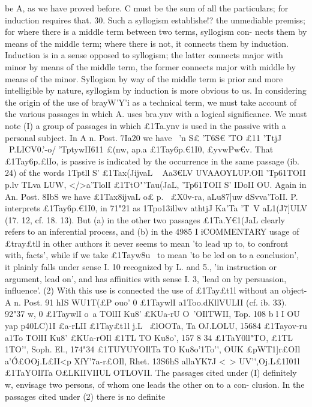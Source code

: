 {{{{{{{{{{{{be A, as we have proved before. C must be the sum of all the
particulars; for induction requires that.
30. Such a syllogism establishe!? the unmediable premiss; for
where there is a middle term between two terms, syllogism con-
nects them by means of the middle term; where there is not, it
connects them by induction. Induction is in a sense opposed to
syllogism; the latter connects major with minor by means of the
middle term, the former connects major with middle by means of
the minor. Syllogism by way of the middle term is prior and more
intelligible by nature, syllogism by induction is more obvious to us.
In considering the origin of the use of brayW'Y'i as a technical
term, we must take account of the various passages in which
A. uses bra.ynv with a logical significance. We must note (I) a
group of passages in which £1Ta.ynv is used in the passive with a
personal subject. In A n. Post. 7Ia20 we have ~'n S£ 'T6S€ 'TO £11
'TtjJ ~P.LICV0.'-o/ 'TptywII611 £(nw, ap.a £1Tay6p.€1I0, £yvwPw€v. That
£1Tay6p.£lIo, is passive is indicated by the occurrence in the same
passage (ib. 24) of the words 1Tptll S' £1Tax(JijvaL ~ Aa{3€LV UVAAOYLUP.OIl
'Tp61TOII p.lv TLva LUW, </>a'TlolI £1TtO"'Tau(JaL, 'Tp61TOII S' IDoII OU. Again
in An. Post. 8IbS we have £1Tax8ijvaL o£ p.~ £X0v-ra, aLu87]uw
dSvva'ToII.
P. interprets £1Tay6p.€1I0, in 71"21 as 1Tpo{1{3illwv athtjJ Ka'Ta 'T~V
aL{1(J7]ULV (17. 12, cf. 18. 13). But (a) in the other two passages
£1Ta.Y€{1(JaL clearly refers to an inferential process, and (b) in the
4985
I
iCOMMENTARY
usage of £tray£tll in other authors it never seems to mean 'to lead
up to, to confront with, facts', while if we take £1Tayw8u~ to mean
'to be led on to a conclusion', it plainly falls under sense I. 10
recognized by L. and 5., 'in instruction or argument, lead on',
and has affinities with sense I. 3, 'lead on by persuasion, influence'.
(2) With this use is connected the use of £1Tay£t1l without an
object-A n. Post. 91 hIS WU1T(£P ouo' 0 £1TaywlI a1Too.dKllVULII (cf.
ib. 33). 92"37 w, 0 £1TaywlI o~a TOlII Ku8' £KUa-rU O~'\WII OIlTWII, Top.
108 b l I OU yap p40LC)1I £a-rLII £1Tay£t1l j.L~ £lOOTa, Ta OJ.LOLU, 15684 £1Tayov-ru
a1To TOlII Ku8' £KUa-rOIl £1TL TO Ku8o'\ov, 157 8 34 £1TaY0ll"TO, £1TL 1TO'\'\OlII,
Soph. El., 174"34 £1TUYUYOIlTa TO Ku8o'\ov 1To'\'\aKL, OUK £pWT1]r£OIl
a'\'\'
O£OOj.L£II<p XfY'7a-r£OIl, Rhet. 13S6hS allaYK7J <~> UV'\'\OYL,Oj.L£1I01l
~ £1TaYOIlTa O£LKIIVIIUL OTLOVII. The passages cited under (I) definitely
w,
envisage two persons, of whom one leads the other on to a con-
clusion. In the passages cited under (2) there is no definite
}}}}}}}}}}}}}}}}}

